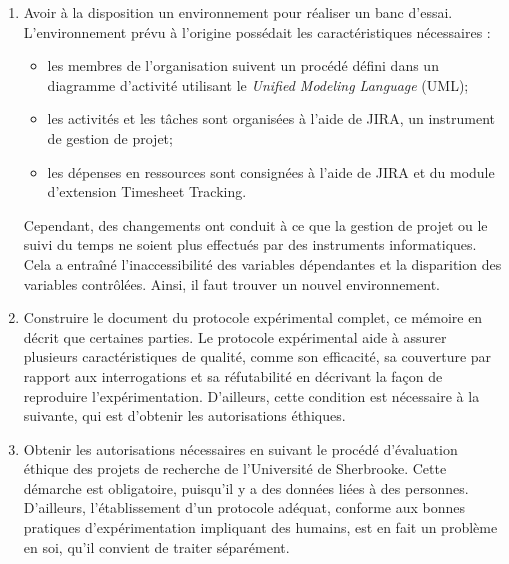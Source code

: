 {\begin{enumerate}
    \item Avoir à la disposition un environnement pour réaliser un banc d'essai. L'environnement prévu à l'origine possédait les caractéristiques nécessaires : 
        \begin{itemize}
        \item les membres de l'organisation suivent un procédé défini dans un diagramme d'activité utilisant le \textit{Unified Modeling Language} (UML);
        \item les activités et les tâches sont organisées à l'aide de JIRA, un instrument de gestion de projet;
        \item les dépenses en ressources sont consignées à l'aide de JIRA et du module d'extension Timesheet Tracking.
    \end{itemize}
    Cependant, des changements ont conduit à ce que la gestion de projet ou le suivi du temps ne soient plus effectués par des instruments informatiques. Cela a entraîné l'inaccessibilité des variables dépendantes et la disparition des variables contrôlées. Ainsi, il faut trouver un nouvel environnement.
    \item Construire le document du protocole expérimental complet, ce mémoire en décrit que certaines parties. Le protocole expérimental aide à assurer plusieurs caractéristiques de qualité, comme son efficacité, sa couverture par rapport aux interrogations et sa réfutabilité en décrivant la façon de reproduire l'expérimentation. D'ailleurs, cette condition est nécessaire à la suivante, qui est d'obtenir les autorisations éthiques.
    \item Obtenir les autorisations nécessaires en suivant le procédé d'évaluation éthique des projets de recherche de l'Université de Sherbrooke. Cette démarche est obligatoire, puisqu'il y a des données liées à des personnes. D'ailleurs, l’établissement d’un protocole adéquat, conforme aux bonnes pratiques d’expérimentation impliquant des humains, est en fait un problème en soi, qu’il convient de traiter séparément.
\end{enumerate}
\leavevmode\vspace{-\baselineskip}
}{}{}

